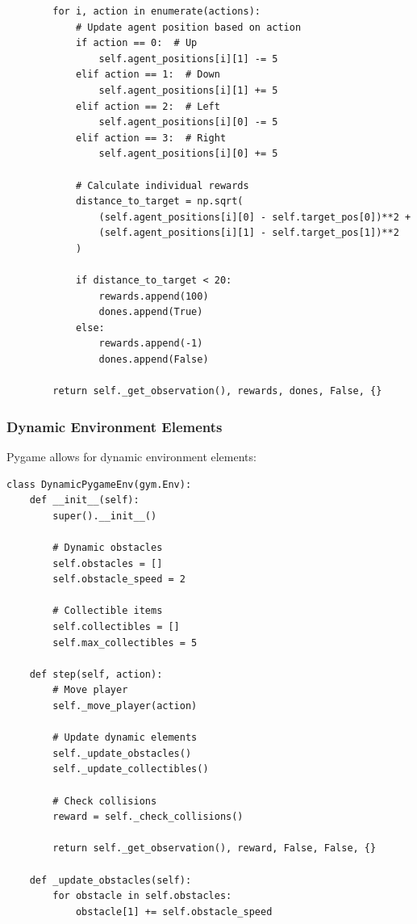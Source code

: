 \documentclass[12pt]{article}
\begin{document}
{{{\begin{verbatim}
        for i, action in enumerate(actions):
            # Update agent position based on action
            if action == 0:  # Up
                self.agent_positions[i][1] -= 5
            elif action == 1:  # Down
                self.agent_positions[i][1] += 5
            elif action == 2:  # Left
                self.agent_positions[i][0] -= 5
            elif action == 3:  # Right
                self.agent_positions[i][0] += 5
                
            # Calculate individual rewards
            distance_to_target = np.sqrt(
                (self.agent_positions[i][0] - self.target_pos[0])**2 + 
                (self.agent_positions[i][1] - self.target_pos[1])**2
            )
            
            if distance_to_target < 20:
                rewards.append(100)
                dones.append(True)
            else:
                rewards.append(-1)
                dones.append(False)
                
        return self._get_observation(), rewards, dones, False, {}
\end{verbatim}

\subsubsection{Dynamic Environment Elements}

Pygame allows for dynamic environment elements:

\begin{verbatim}
class DynamicPygameEnv(gym.Env):
    def __init__(self):
        super().__init__()
        
        # Dynamic obstacles
        self.obstacles = []
        self.obstacle_speed = 2
        
        # Collectible items
        self.collectibles = []
        self.max_collectibles = 5
        
    def step(self, action):
        # Move player
        self._move_player(action)
        
        # Update dynamic elements
        self._update_obstacles()
        self._update_collectibles()
        
        # Check collisions
        reward = self._check_collisions()
        
        return self._get_observation(), reward, False, False, {}
        
    def _update_obstacles(self):
        for obstacle in self.obstacles:
            obstacle[1] += self.obstacle_speed
            

\end{verbatim}}}}
\end{document}
